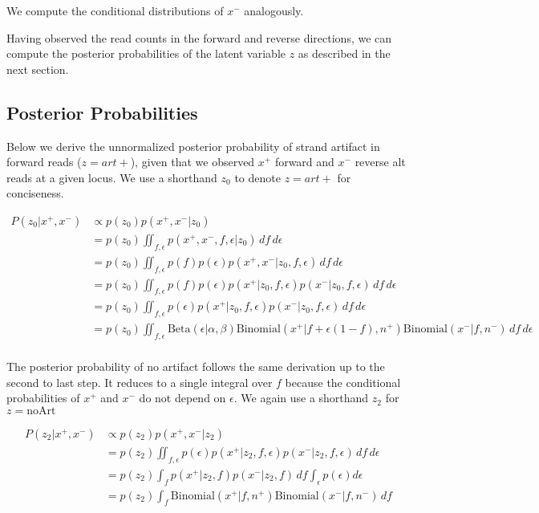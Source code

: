 \documentclass[a4paper]{article}
\begin{document}
We compute the conditional distributions of $x^-$  analogously.

Having observed the read counts in the forward and reverse directions, we can compute the posterior probabilities of the latent variable $z$ as described in the next section.

\subsection{Posterior Probabilities}

Below we derive the unnormalized posterior probability of strand artifact in forward reads ($z = art+$), given that we observed $x^+$ forward and $x^-$ reverse alt reads at a given locus. We use a shorthand $z_0$ to denote $z=art+$ for conciseness. 

\begin{equation}
\begin{split}
P(z_0 |x^+, x^-) & \propto p(z_0) p(x^+, x^- | z_0) \\
& = p(z_0) \iint_{f, \epsilon}  p(x^+, x^-, f, \epsilon | z_0) \,df\,d\epsilon \\
& = p(z_0) \iint_{f, \epsilon}  p(f) p(\epsilon) p(x^+, x^- | z_0, f, \epsilon) \,df\,d\epsilon \\
& = p(z_0) \iint_{f, \epsilon}  p(f) p(\epsilon) p(x^+ | z_0, f, \epsilon) p(x^- | z_0, f, \epsilon) \,df\,d\epsilon \\
& = p(z_0) \iint_{f, \epsilon}  p(\epsilon) p(x^+ | z_0, f, \epsilon) p(x^- | z_0, f, \epsilon) \,df\,d\epsilon \\
& = p(z_0) \iint_{f, \epsilon}  \mathrm{Beta}(\epsilon|\alpha, \beta) \mathrm{Binomial}(x^+ | f + \epsilon(1-f), n^+) \mathrm{Binomial}(x^- | f, n^-) \,df\,d\epsilon \\
\end{split}
\end{equation}

The posterior probability of no artifact follows the same derivation up to the second to last step. It reduces to a single integral over $f$ because the conditional probabilities of $x^+$ and $x^-$ do not depend on $\epsilon$. We again use a shorthand $z_2$ for $z=\mathrm{noArt}$

\begin{equation}
\begin{split}
P(z_2 |x^+, x^-) & \propto p(z_2) p(x^+, x^- | z_2) \\
		    & = p(z_2) \iint_{f, \epsilon}  p(\epsilon) p(x^+ | z_2, f, \epsilon) p(x^- | z_2, f, \epsilon) \,df\,d\epsilon \\
		    & = p(z_2) \int_{f}  p(x^+ | z_2, f) p(x^- | z_2, f) \,df \int_{\epsilon}  p(\epsilon) d\epsilon \\
                     & = p(z_2) \int_{f}  \mathrm{Binomial}(x^+ | f, n^+) \mathrm{Binomial}(x^- | f, n^-) \,df \\
\end{split}
\end{equation}
\end{document}
